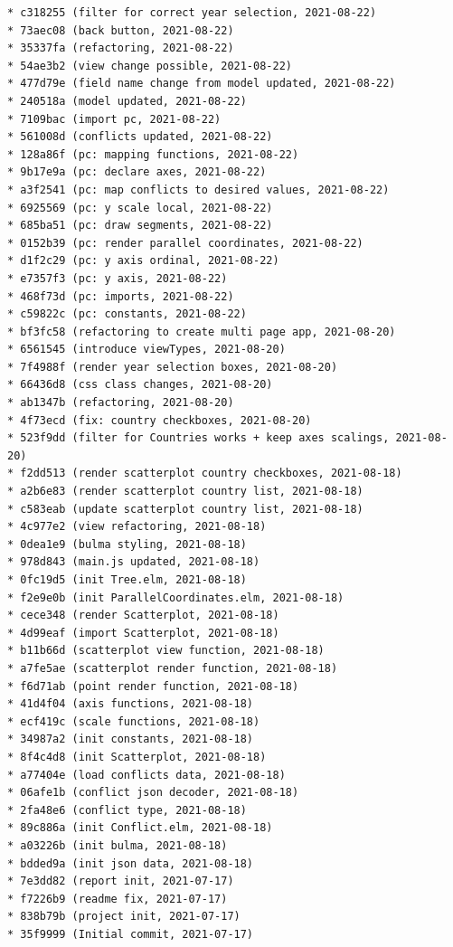 \documentclass[usegeometry=true]{scrartcl}
\begin{document}
\begin{verbatim}
* c318255 (filter for correct year selection, 2021-08-22)
* 73aec08 (back button, 2021-08-22)
* 35337fa (refactoring, 2021-08-22)
* 54ae3b2 (view change possible, 2021-08-22)
* 477d79e (field name change from model updated, 2021-08-22)
* 240518a (model updated, 2021-08-22)
* 7109bac (import pc, 2021-08-22)
* 561008d (conflicts updated, 2021-08-22)
* 128a86f (pc: mapping functions, 2021-08-22)
* 9b17e9a (pc: declare axes, 2021-08-22)
* a3f2541 (pc: map conflicts to desired values, 2021-08-22)
* 6925569 (pc: y scale local, 2021-08-22)
* 685ba51 (pc: draw segments, 2021-08-22)
* 0152b39 (pc: render parallel coordinates, 2021-08-22)
* d1f2c29 (pc: y axis ordinal, 2021-08-22)
* e7357f3 (pc: y axis, 2021-08-22)
* 468f73d (pc: imports, 2021-08-22)
* c59822c (pc: constants, 2021-08-22)
* bf3fc58 (refactoring to create multi page app, 2021-08-20)
* 6561545 (introduce viewTypes, 2021-08-20)
* 7f4988f (render year selection boxes, 2021-08-20)
* 66436d8 (css class changes, 2021-08-20)
* ab1347b (refactoring, 2021-08-20)
* 4f73ecd (fix: country checkboxes, 2021-08-20)
* 523f9dd (filter for Countries works + keep axes scalings, 2021-08-20)
* f2dd513 (render scatterplot country checkboxes, 2021-08-18)
* a2b6e83 (render scatterplot country list, 2021-08-18)
* c583eab (update scatterplot country list, 2021-08-18)
* 4c977e2 (view refactoring, 2021-08-18)
* 0dea1e9 (bulma styling, 2021-08-18)
* 978d843 (main.js updated, 2021-08-18)
* 0fc19d5 (init Tree.elm, 2021-08-18)
* f2e9e0b (init ParallelCoordinates.elm, 2021-08-18)
* cece348 (render Scatterplot, 2021-08-18)
* 4d99eaf (import Scatterplot, 2021-08-18)
* b11b66d (scatterplot view function, 2021-08-18)
* a7fe5ae (scatterplot render function, 2021-08-18)
* f6d71ab (point render function, 2021-08-18)
* 41d4f04 (axis functions, 2021-08-18)
* ecf419c (scale functions, 2021-08-18)
* 34987a2 (init constants, 2021-08-18)
* 8f4c4d8 (init Scatterplot, 2021-08-18)
* a77404e (load conflicts data, 2021-08-18)
* 06afe1b (conflict json decoder, 2021-08-18)
* 2fa48e6 (conflict type, 2021-08-18)
* 89c886a (init Conflict.elm, 2021-08-18)
* a03226b (init bulma, 2021-08-18)
* bdded9a (init json data, 2021-08-18)
* 7e3dd82 (report init, 2021-07-17)
* f7226b9 (readme fix, 2021-07-17)
* 838b79b (project init, 2021-07-17)
* 35f9999 (Initial commit, 2021-07-17)
\end{verbatim}
\printbibliography
\end{document}
